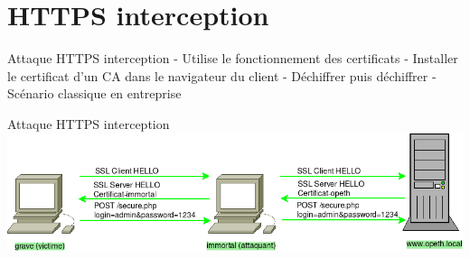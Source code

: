 \section{HTTPS interception}

\begin{frame}{Attaque HTTPS interception}
  - Utilise le fonctionnement des certificats
  - Installer le certificat d'un CA dans le navigateur du client
  - Déchiffrer puis déchiffrer
  - Scénario classique en entreprise
\end{frame}

\begin{frame}{Attaque HTTPS interception}
    \includegraphics[width=\linewidth]{../medias/https-interception/attack.png}
\end{frame}

